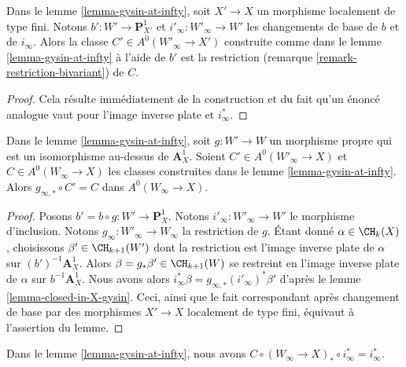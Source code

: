 \begin{lemma}
\label{lemma-base-change-gysin-at-infty}
Dans le lemme \ref{lemma-gysin-at-infty}, soit $X' \to X$ un morphisme
localement de type fini. Notons $b' : W' \to \mathbf{P}^1_{X'}$
et $i'_\infty : W'_\infty \to W'$ les changements de base de $b$ et de $i_\infty$.
Alors la classe $C' \in A^0(W'_\infty \to X')$ construite comme dans le
lemme \ref{lemma-gysin-at-infty} à l'aide de $b'$ est la restriction
(remarque \ref{remark-restriction-bivariant}) de $C$.
\end{lemma}

\begin{proof}
Cela résulte immédiatement de la construction et du fait qu'un énoncé analogue
vaut pour l'image inverse plate et $i_\infty^*$.
\end{proof}

\begin{lemma}
\label{lemma-gysin-at-infty-independent}
Dans le lemme \ref{lemma-gysin-at-infty}, soit $g : W' \to W$ un morphisme propre
qui est un isomorphisme au-dessus de $\mathbf{A}^1_X$. Soient
$C' \in A^0(W'_\infty \to X)$ et $C \in A^0(W_\infty \to X)$
les classes construites dans le lemme \ref{lemma-gysin-at-infty}.
Alors $g_{\infty, *} \circ C' = C$ dans $A^0(W_\infty \to X)$.
\end{lemma}

\begin{proof}
Posons $b' = b \circ g : W' \to \mathbf{P}^1_X$. Notons
$i'_\infty : W'_\infty \to W'$ le morphisme d'inclusion.
Notons $g_\infty : W'_\infty \to W_\infty$ la restriction de $g$.
Étant donné $\alpha \in \CH_k(X)$, choisissons $\beta' \in \CH_{k + 1}(W')$
dont la restriction est l'image inverse plate de $\alpha$ sur $(b')^{-1}\mathbf{A}^1_X$.
Alors $\beta = g_*\beta' \in \CH_{k + 1}(W)$ se restreint en
l'image inverse plate de $\alpha$ sur $b^{-1}\mathbf{A}^1_X$.
Nous avons alors $i_\infty^*\beta = g_{\infty, *}(i'_\infty)^*\beta'$
d'après le lemme \ref{lemma-closed-in-X-gysin}.
Ceci, ainsi que le fait correspondant après changement de base par des
morphismes $X' \to X$ localement de type fini, équivaut
à l'assertion du lemme.
\end{proof}

\begin{lemma}
\label{lemma-homomorphism-pre}
Dans le lemme \ref{lemma-gysin-at-infty}, nous avons
$C \circ (W_\infty \to X)_* \circ i_\infty^* = i_\infty^*$.
\end{lemma}

